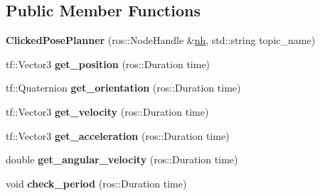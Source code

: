 \subsection*{Public Member Functions}
\begin{DoxyCompactItemize}
\item 
{\bfseries Clicked\+Pose\+Planner} (ros\+::\+Node\+Handle \&\hyperlink{classPlanner_a9714d036f444a07ce90be8d135b9a40c}{nh}, std\+::string topic\+\_\+name)\hypertarget{classClickedPosePlanner_a74a3e5f887074f15a88c617c5269ff6f}{}\label{classClickedPosePlanner_a74a3e5f887074f15a88c617c5269ff6f}

\item 
tf\+::\+Vector3 {\bfseries get\+\_\+position} (ros\+::\+Duration time)\hypertarget{classClickedPosePlanner_afc1871c54217d03e9e324f01b6f237a0}{}\label{classClickedPosePlanner_afc1871c54217d03e9e324f01b6f237a0}

\item 
tf\+::\+Quaternion {\bfseries get\+\_\+orientation} (ros\+::\+Duration time)\hypertarget{classClickedPosePlanner_ad0dc3f1824a1e8127cdda0d933700dec}{}\label{classClickedPosePlanner_ad0dc3f1824a1e8127cdda0d933700dec}

\item 
tf\+::\+Vector3 {\bfseries get\+\_\+velocity} (ros\+::\+Duration time)\hypertarget{classClickedPosePlanner_acdbdcf7b2e811542ccd812b72534bcfb}{}\label{classClickedPosePlanner_acdbdcf7b2e811542ccd812b72534bcfb}

\item 
tf\+::\+Vector3 {\bfseries get\+\_\+acceleration} (ros\+::\+Duration time)\hypertarget{classClickedPosePlanner_ade095ec782bd78a10dc397d039c49df1}{}\label{classClickedPosePlanner_ade095ec782bd78a10dc397d039c49df1}

\item 
double {\bfseries get\+\_\+angular\+\_\+velocity} (ros\+::\+Duration time)\hypertarget{classClickedPosePlanner_a29ea1f54b9103ffcffb13867c654c550}{}\label{classClickedPosePlanner_a29ea1f54b9103ffcffb13867c654c550}

\item 
void {\bfseries check\+\_\+period} (ros\+::\+Duration time)\hypertarget{classClickedPosePlanner_afa168a05970471ef34bd5ba19bbe4a0b}{}\label{classClickedPosePlanner_afa168a05970471ef34bd5ba19bbe4a0b}

\end{DoxyCompactItemize}
